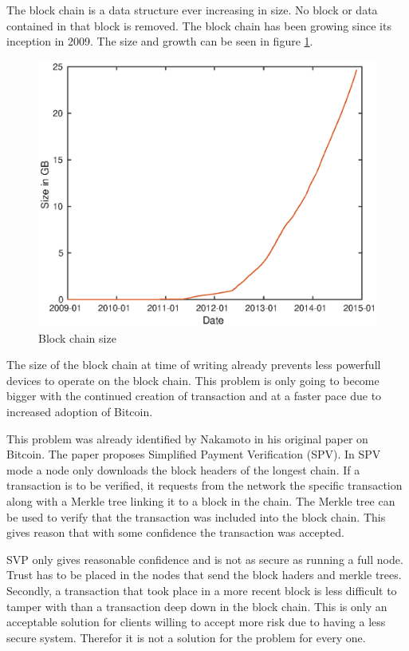 The block chain is a data structure ever increasing in size.
No block or data contained in that block is removed.
The block chain has been growing since its inception in 2009.
The size and growth can be seen in figure \ref{fig:bc-size}.

\begin{figure}[H]
        \centerline{\includegraphics[scale=0.6]{problemDescription/figs/bcs/blockchainsize.eps}}
        \caption{Block chain size\cite{Blockchain.info-bcs}}
	\label{fig:bc-size}
\end{figure}

The size of the block chain at time of writing already prevents less powerfull devices
to operate on the block chain.
This problem is only going to become bigger with the continued creation of transaction
and at a faster pace due to increased adoption of Bitcoin.

This problem was already identified by Nakamoto in his original paper on Bitcoin.
The paper proposes Simplified Payment Verification (SPV).
In SPV mode a node only downloads the block headers of the longest chain.
If a transaction is to be verified, it requests from the network the specific transaction
along with a Merkle tree linking it to a block in the chain.
The Merkle tree can be used to verify that the transaction was included into the block chain.
This gives reason that with some confidence the transaction was accepted.

SVP only gives reasonable confidence and is not as secure as running a full node.
Trust has to be placed in the nodes that send the block haders and merkle trees.
Secondly, a transaction that took place in a more recent block is less difficult to tamper with
than a transaction deep down in the block chain.
This is only an acceptable solution for clients willing to accept more risk due to having a less secure system.
Therefor it is not a solution for the problem for every one.

